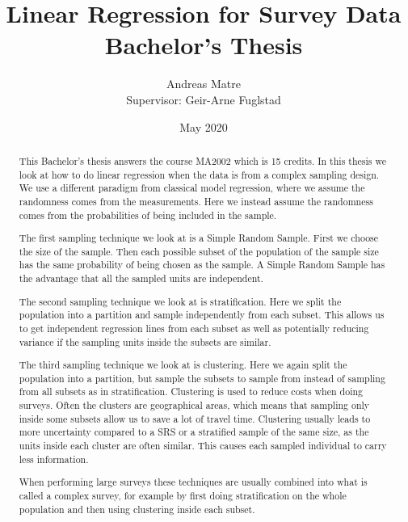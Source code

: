 \documentclass{article}
\title{\textbf{Linear Regression for Survey Data} \\
{\Large Bachelor's Thesis}}
\author{Andreas Matre \\
Supervisor: Geir-Arne Fuglstad}
\date{May 2020}
\begin{document}
\newtheorem{definition}{Definition}
\newtheorem{theorem}{Theorem}
\newtheorem{example}{Example}


\maketitle

\begin{abstract}
  This Bachelor's thesis answers the course MA2002 which is 15 credits.
  In this thesis we look at how to do linear regression when the data is from a
  complex sampling design. We use a different paradigm from classical model
  regression, where we assume the randomness comes from the measurements. Here
  we instead assume the randomness comes from the probabilities of being
  included in the sample.

  The first sampling technique we look at is a Simple Random Sample. First we
  choose the size of the sample. Then each possible subset of
  the population of the sample size has the same probability of being chosen as
  the sample. A Simple Random Sample has the advantage that all the sampled
  units are independent.

  The second sampling technique we look at is stratification. Here we split the
  population into a partition and sample independently from each subset. This
  allows us to get independent regression lines from each subset as well as
  potentially reducing variance if the sampling units inside the subsets are
  similar.

  The third sampling technique we look at is clustering. Here we again split
  the population into a partition, but sample the subsets to sample from instead
  of sampling from all subsets as in stratification. Clustering is used
  to reduce costs when doing surveys. Often the clusters are geographical areas,
  which means that sampling only inside some subsets allow us to save a lot of
  travel time. Clustering usually leads to more uncertainty compared to a SRS
  or a stratified sample of the same size, as the units inside each cluster are
  often similar. This causes each sampled individual to carry less information.

  When performing large surveys these techniques are usually combined into what
  is called a complex survey, for example by first doing stratification on the
  whole population and then using clustering inside each subset.
\end{abstract}
\end{document}
